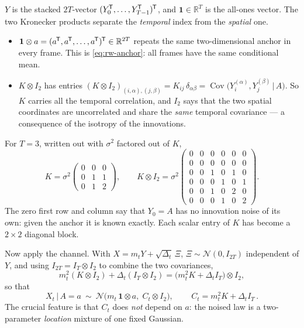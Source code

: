 \documentclass[11pt,a4paper]{article}
\newcommand{\R}{\mathbb{R}}
\newcommand{\N}{\mathcal{N}}
\newcommand{\given}{\,\vert\,}
\newcommand{\mt}{m_t}
\newcommand{\Dt}{\Delta_t}
\newcommand{\Cov}{\operatorname{Cov}}
\newcommand{\T}{^{\mkern-1.5mu\mathsf{T}}}
\begin{document}
\begin{definitionbox}
$Y$ is the stacked $2T$-vector $(Y_0\T,\ldots,Y_{T-1}\T)\T$, and $\mathbf1\in\R^T$ is the
all-ones vector. The two Kronecker products separate the \emph{temporal} index from the
\emph{spatial} one.
\begin{itemize}
\item $\mathbf1\otimes a=(a\T,a\T,\ldots,a\T)\T\in\R^{2T}$ repeats the same
      two-dimensional anchor in every frame. This is \eqref{eq:rw-anchor}: all frames have the
      same conditional mean.
\item $K\otimes I_2$ has entries
      $(K\otimes I_2)_{(i,\alpha),(j,\beta)}=K_{ij}\,\delta_{\alpha\beta}
      =\Cov\big(Y_i^{(\alpha)},Y_j^{(\beta)}\given A\big)$.
      So $K$ carries all the temporal correlation, and $I_2$ says that the two spatial
      coordinates are uncorrelated and share the \emph{same} temporal covariance --- a
      consequence of the isotropy of the innovations.
\end{itemize}
For $T=3$, written out with $\sigma^2$ factored out of $K$,
\[
 K=\sigma^2\!\begin{pmatrix}0&0&0\\0&1&1\\0&1&2\end{pmatrix},
 \qquad
 K\otimes I_2=\sigma^2\!
 \begin{pmatrix}
 0&0&0&0&0&0\\
 0&0&0&0&0&0\\
 0&0&1&0&1&0\\
 0&0&0&1&0&1\\
 0&0&1&0&2&0\\
 0&0&0&1&0&2
 \end{pmatrix}.
\]
The zero first row and column say that $Y_0=A$ has no innovation noise of its own: given the
anchor it is known exactly. Each scalar entry of $K$ has become a $2\times2$ diagonal block.
\end{definitionbox}

Now apply the channel. With $X=\mt Y+\sqrt{\Dt}\,\Xi$, $\Xi\sim\N(0,I_{2T})$ independent of
$Y$, and using $I_{2T}=I_T\otimes I_2$ to combine the two covariances,
\begin{equation}
 \mt^2(K\otimes I_2)+\Dt(I_T\otimes I_2)=\big(\mt^2K+\Dt I_T\big)\otimes I_2 ,
\end{equation}
so that
\begin{equation}
 X_t\given A=a\ \sim\ \N\big(\mt\,\mathbf1\otimes a,\;C_t\otimes I_2\big),
 \qquad \boxed{\,C_t=\mt^2K+\Dt I_T\,}.
 \label{eq:surrogate-C}
\end{equation}
The crucial feature is that $C_t$ does \emph{not} depend on $a$: the noised law is a
two-parameter \emph{location} mixture of one fixed Gaussian.
\end{document}
